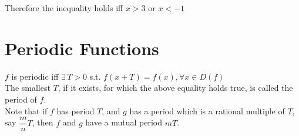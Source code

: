 \documentclass[fleqn]{article}
\begin{document}
Therefore the inequality holds iff $x > 3$ or $x < -1$

\section{Periodic Functions}

$f$ is periodic iff $\exists \, T>0$ s.t. $f(x+T) = f(x), \forall x \in D(f)$\\
The smallest $T$, if it exists, for which the above equality holds true, is called the period of $f$.\\
Note that if $f$ has period $T$, and $g$ has a period which is a rational multiple of $T$, say $\dfrac{m}{n} T$, then $f$ and $g$ have a mutual period $mT$.
\end{document}
